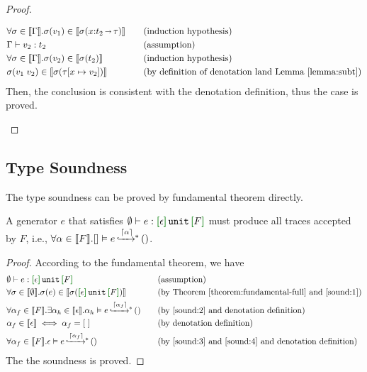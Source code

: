 \begin{proof}
\begin{enumerate}[label=Case]
{\begin{alignat}{2}
  &\forall \sigma \in \llbracket {\Gamma} \rrbracket. \sigma(v_1) \in \llbracket {\sigma(x{:}t_2 {\,\shortrightarrow\,}\tau)} \rrbracket &\quad& \text{(induction hypothesis)} \label{found:9-2} \\
  &\Gamma \vdash v_2 : t_2 &\quad& \text{(assumption)} \label{found:9-3} \\
  &\forall \sigma \in \llbracket {\Gamma} \rrbracket. \sigma(v_2) \in \llbracket {\sigma(t_2)} \rrbracket &\quad& \text{(induction hypothesis)} \label{found:9-4} \\
  &\sigma(v_1 \; v_2) \in \llbracket {\sigma(\tau[x\mapsto v_2])} \rrbracket &\quad& \text{(by definition of denotation land Lemma~\ref{lemma:subt})} \label{found:9-6}
  \end{alignat}}\noindent
Then, the conclusion is consistent with the denotation definition, thus the case is proved.
\end{enumerate}
\end{proof}

\subsection{Type Soundness}

The type soundness can be proved by fundamental theorem directly.

\begin{corollary} A generator \(e\) that satisfies
  \(\emptyset \vdash e : \uhat{\epsilon}{\Unit}{F}\) must produce all
  traces accepted by $F$, i.e.,
  $\forall \alpha \in
  \llbracket {F} \rrbracket. {[]}\vDash{e}{\,\xhookrightarrow{\lceil {\alpha} \rceil}\,\hspace{-5pt}^*\,}{()}$.
\end{corollary}
\begin{proof} According to the fundamental theorem, we have
{\footnotesize\begin{alignat}{2}
  \setcounter{equation}{0}
  &\emptyset \vdash e : \uhat{\epsilon}{\Unit}{F} \ptag{assumption} \label{sound:1} \\
  &\forall \sigma \in \denot{\emptyset}. \sigma(e) \in \denot{\sigma(\uhat{\epsilon}{\Unit}{F})} \ptag{by Theorem~\ref{theorem:fundamental-full} and \ref{sound:1}} \label{sound:2} \\
  &\forall \alpha_f \in \denot{F}. \exists \alpha_h \in \denot{\epsilon}. \msteptr{\alpha_h}{e}{\eraseGhost{\alpha_f}}{()} \ptag{by \ref{sound:2} and denotation definition} \label{sound:3} \\
  &\alpha_f \in \denot{\epsilon} \iff \alpha_f = [\;] \ptag{by  denotation definition} \label{sound:4} \\
  &\forall \alpha_f \in \denot{F}. \msteptr{\epsilon}{e}{\eraseGhost{\alpha_f}}{()} \ptag{by \ref{sound:3} and \ref{sound:4} and denotation definition} \label{sound:5}
  \end{alignat}}\noindent
The the soundness is proved.
\end{proof}


